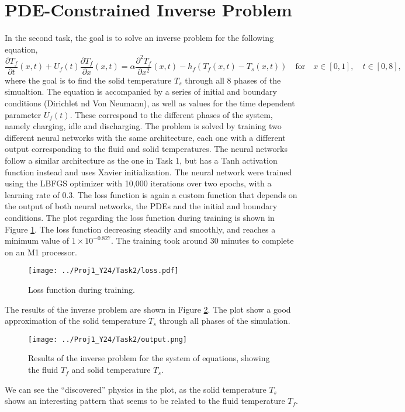 \documentclass[unicode,11pt,a4paper,oneside,numbers=endperiod,openany]{scrartcl}
\begin{document}
\section{PDE-Constrained Inverse Problem}\label{sec:task2}
In the second task, the goal is to solve an inverse problem for the following
equation,
\begin{equation}
    \frac{\partial T_f}{\partial t}(x,t) + U_f(t)\frac{\partial T_f}{\partial x}(x,t) = \alpha \frac{\partial^2 T_f}{\partial x^2} (x,t) - h_f(T_f(x,t)-T_s(x,t)) \quad \text{for} \quad x \in [0, 1], \quad t \in [0, 8],
\end{equation}
where the goal is to find the solid temperature $T_s$ through all 8 phases of
the simualtion. The equation is accompanied by a series of initial and boundary
conditions (Dirichlet nd Von Neumann), as well as values for the time dependent
parameter $U_f(t)$. These correspond to the different phases of the system,
namely charging, idle and discharging. The problem is solved by
training two different neural
networks with the same architecture, each one with a different output
corresponding to the fluid and solid temperatures. The neural networks follow a
similar architecture as the one in Task 1, but has a Tanh activation function
instead and uses Xavier initialization.
The neural network were trained using the
LBFGS optimizer with 10,000 iterations over two epochs, with a learning rate of 0.3. The loss
function is again a custom function that depends on the output of both neural
networks, the PDEs and the initial and boundary conditions. The plot regarding the loss
function during training is shown in Figure \ref{fig:task2_loss}. The loss
function decreasing steadily and smoothly, and reaches a minimum value of
$1\times 10^{-0.827}$.
The training took around 30 minutes to complete on an M1 processor.
\begin{figure}
    \centering
    \texttt{[image: ../Proj1\_Y24/Task2/loss.pdf]}
    \caption{Loss function during training.}
    \label{fig:task2_loss}
\end{figure}
The results of the inverse problem are shown in Figure \ref{fig:task2}. The plot
show a good approximation of the solid temperature $T_s$ through all phases of
the simulation.
\begin{figure}[h]
    \centering
    \texttt{[image: ../Proj1\_Y24/Task2/output.png]}
    \caption{Results of the inverse problem for the system of equations, showing the fluid  $T_f$ and solid temperature $T_s$.}
    \label{fig:task2}
\end{figure}
We can see the ``discovered'' physics in the plot, as the solid temperature
$T_s$
shows an interesting pattern that seems to be related to the fluid temperature
$T_f$.
\end{document}
